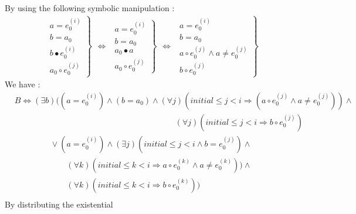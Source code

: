 \documentclass[a4paper,10pt]{article}
\newcommand{\idx}{\ensuremath{i}\xspace}
\newcommand{\idxinitial}{\ensuremath{\mathit{initial}}\xspace}
\newcommand{\at}[1]{{(#1)}}
\newcommand{\impl}{\ensuremath{\Longrightarrow}}
\newcommand{\Inv}[1]{\ensuremath{\mathit{Inv}(#1)\xspace}}
\newenvironment{proof}[1][Proof.]{\begin{trivlist}
\item[\hskip \labelsep {\bfseries #1}]}{\end{trivlist}}
\begin{document}
\begin{proof}
  By using the following symbolic manipulation :
  $$\begin{array}{cl}
    \left.\begin{aligned}
      a = e_0^\at{\idx}\\
      b = a_0\\
      b \bullet e_0^\at{\idx}\\
      a_0 \circ e_0^\at{j}
    \end{aligned} \right\}
  \end{array} 
  \Leftrightarrow
  \begin{array}{cl}
    \left.\begin{aligned}
      a = e_0^\at{\idx}\\
      b = a_0\\
      a_0 \bullet a\\
      a_0 \circ e_0^\at{j}
    \end{aligned} \right\}
   \end{array}
  \Leftrightarrow
  \begin{array}{cl}
    \left.\begin{aligned}
      a = e_0^\at{\idx}\\
      b = a_0\\
      a \circ e_0^\at{j} \land a \neq e_0^\at{j}\\
      b \circ e_0^\at{j}
    \end{aligned} \right\}
   \end{array}$$
  We have :
  \begin{align*}
    &B\Leftrightarrow (\exists b) ((a = e_0^\at{\idx}) \land (b = a_0) \land 
       (\forall j)(\idxinitial \leq j < \idx \impl (a \circ e_0^\at{j} \land a \neq e_0^\at{j})) \land\\
    &\phantom{(a = e_0^\at{\idx}) \land (\exists b) ((b \bullet e_0^\at{\idx}) \land \Inv{\idx}} 
       (\forall j)(\idxinitial \leq j < \idx \impl b \circ e_0^\at{j})\\
    &\phantom{B= (a =} 
       \lor (a = e_0^\at{\idx}) \land (\exists j)(\idxinitial \leq j < \idx \land b = e_0^\at{j}) \land \\
    &\phantom{B= (a = e_0^\at{\idx}} 
       (\forall k)(\idxinitial \leq k < \idx \impl a \circ e_0^\at{k} \land a \neq e_0^\at{k})) \land\\
    &\phantom{B= (a = e_0^\at{\idx}} 
       (\forall k)(\idxinitial \leq k < \idx \impl b \circ e_0^\at{k})) \\
  \end{align*}
  By distributing the existential 

\end{proof}
\end{document}
